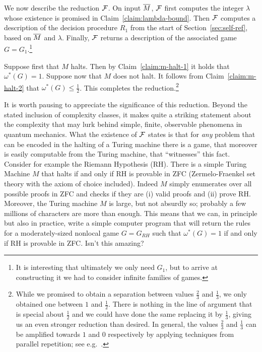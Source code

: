 We now describe the reduction $\mathcal{F}$. On input $\overline{M}$, $\mathcal{F}$ first computes the integer $\lambda$ whose existence is promised in Claim~\ref{claim:lambda-bound}. Then $\mathcal{F}$ computes a description of the decision procedure $R_1$ from the start of Section~\ref{sec:self-ref}, based on $\overline{M}$ and $\lambda$. Finally, $\mathcal{F}$ returns a description of the associated game $G=G_1$.\footnote{It is interesting that ultimately we only need $G_1$, but to arrive at constructing it we had to consider infinite families of games.} 

Suppose first that $M$ halts. Then by Claim~\ref{claim:m-halt-1} it holds that  $\omega^*(G)=1$. Suppose now that $M$ does not halt. It follows from Claim~\ref{claim:m-halt-2} that $\omega^*(G)\leq \frac{1}{2}$. 
This completes the reduction.\footnote{While we promised to obtain a separation between values $\frac{2}{3}$ and $\frac{1}{3}$, we only obtained one between $1$ and $\frac{1}{2}$. There is nothing in the line of argument that is special about $\frac{1}{2}$ and we could have done the same replacing it by $\frac{1}{3}$, giving us an even stronger reduction than desired. In general, the values $\frac{2}{3}$ and $\frac{1}{3}$ can be amplified towards $1$ and $0$ respectively by applying techniques from parallel repetition; see e.g.~\cite{yuen2016parallel}.}

\begin{remark}
It is worth pausing to appreciate the significance of this reduction. Beyond the stated inclusion of complexity classes, it makes quite a striking statement about the complexity that may lurk behind simple, finite, observable phenomena in quantum mechanics. What the existence of $\mathcal{F}$ states is that for \emph{any} problem that can be encoded in the halting of a Turing machine there is a game, that moreover is easily computable from the Turing machine, that ``witnesses'' this fact. Consider for example the Riemann Hypothesis (RH). There is a simple Turing Machine $M$ that halts if and only if RH is provable in ZFC (Zermelo-Fraenkel set theory with the axiom of choice included). Indeed $M$ simply enumerates over all possible proofs in ZFC and checks if they are (i) valid proofs and (ii) prove RH. Moreover, the Turing machine $M$ is large, but not absurdly so; probably a few millions of characters are more than enough. This means that we can, in principle but also in practice, write a simple computer program that will return the rules for a moderately-sized nonlocal game $G=G_{RH}$ such that $\omega^*(G)=1$ if and only if RH is provable in ZFC. Isn't this amazing?
\end{remark}

